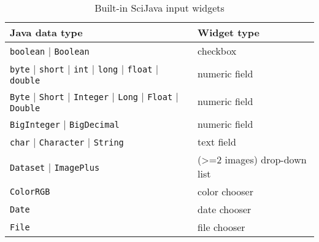 \documentclass{bmcart}
\begin{document}
\begin{backmatter}
  \begin{table}[h!]
    \caption{Built-in SciJava input widgets}
    \begin{tabular}{| l | l |}
      \hline
      \textbf{Java data type}                                                                                                            & \textbf{Widget type}                   \\ \hline
      \texttt{boolean} $\vert$ \texttt{Boolean}                                                                                          & checkbox                               \\ \hline
      \texttt{byte} $\vert$ \texttt{short} $\vert$ \texttt{int}     $\vert$ \texttt{long} $\vert$ \texttt{float} $\vert$ \texttt{double} & numeric field                          \\ \hline
      \texttt{Byte} $\vert$ \texttt{Short} $\vert$ \texttt{Integer} $\vert$ \texttt{Long} $\vert$ \texttt{Float} $\vert$ \texttt{Double} & numeric field                          \\ \hline
      \texttt{BigInteger} $\vert$ \texttt{BigDecimal}                                                                                    & numeric field                          \\ \hline
      \texttt{char} $\vert$ \texttt{Character} $\vert$ \texttt{String}                                                                   & text field                             \\ \hline
      \texttt{Dataset} $\vert$ \texttt{ImagePlus}                                                                                        & (\textgreater=2 images) drop-down list \\ \hline
      \texttt{ColorRGB}                                                                                                                  & color chooser                          \\ \hline
      \texttt{Date}                                                                                                                      & date chooser                           \\ \hline
      \texttt{File}                                                                                                                      & file chooser                           \\ \hline
    \end{tabular}
  \end{table}


\end{backmatter}
\end{document}
